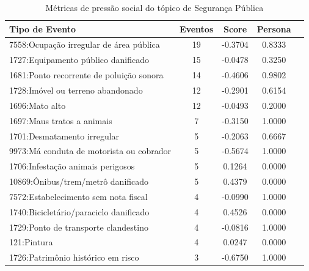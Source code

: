 \begin{table}[htbp]
	\centering
	\caption{Métricas de pressão social do tópico de Segurança Pública}
	\label{tab:eventos_populares_security}
	\begin{tabular}{|l|c|c|c|c|}
		\hline
		\textbf{Tipo de Evento}                     & \textbf{Eventos} & \textbf{Score} & \textbf{Persona} \\
		\hline
		7558:Ocupação irregular de área pública     & 19               & -0.3704        & 0.8333           \\
		\hline
		1727:Equipamento público danificado         & 15               & -0.0478        & 0.3250           \\
		\hline
		1681:Ponto recorrente de poluição sonora    & 14               & -0.4606        & 0.9802           \\
		\hline
		1728:Imóvel ou terreno abandonado           & 12               & -0.2901        & 0.6154           \\
		\hline
		1696:Mato alto                              & 12               & -0.0493        & 0.2000           \\
		\hline
		1697:Maus tratos a animais                  & 7                & -0.3150        & 1.0000           \\
		\hline
		1701:Desmatamento irregular                 & 5                & -0.2063        & 0.6667           \\
		\hline
		9973:Má conduta de motorista ou cobrador    & 5                & -0.5674        & 1.0000           \\
		\hline
		1706:Infestação animais perigosos           & 5                & 0.1264         & 0.0000           \\
		\hline
		10869:Ônibus/trem/metrô danificado          & 5                & 0.4379         & 0.0000           \\
		\hline
		7572:Estabelecimento sem nota fiscal        & 4                & -0.0990        & 1.0000           \\
		\hline
		1740:Bicicletário/paraciclo danificado      & 4                & 0.4526         & 0.0000           \\
		\hline
		1729:Ponto de transporte clandestino        & 4                & -0.0816        & 1.0000           \\
		\hline
		121:Pintura                                 & 4                & 0.0247         & 0.0000           \\
		\hline
		1726:Patrimônio histórico em risco          & 3                & -0.6750        & 1.0000           \\

\end{tabular}
\end{table}
